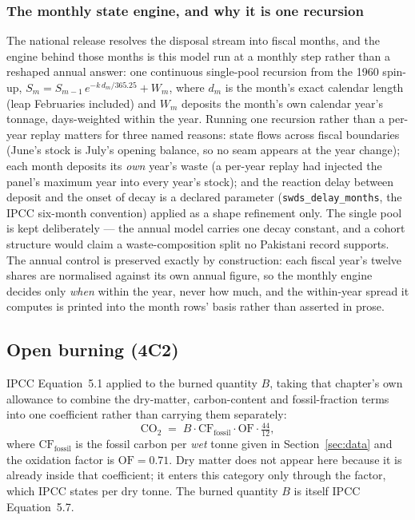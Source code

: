 \subsubsection{The monthly state engine, and why it is one recursion}

The national release resolves the disposal stream into fiscal months, and the
engine behind those months is this model run at a monthly step rather than a
reshaped annual answer: one continuous single-pool recursion from the 1960
spin-up, $S_m = S_{m-1}\,e^{-k\,d_m/365.25} + W_m$, where $d_m$ is the month's
exact calendar length (leap Februaries included) and $W_m$ deposits the month's
own calendar year's tonnage, days-weighted within the year. Running one recursion
rather than a per-year replay matters for three named reasons: state flows across
fiscal boundaries (June's stock is July's opening balance, so no seam appears at
the year change); each month deposits its \emph{own} year's waste (a per-year
replay had injected the panel's maximum year into every year's stock); and the
reaction delay between deposit and the onset of decay is a declared parameter
(\texttt{swds\_delay\_months}, the IPCC six-month convention) applied as a shape
refinement only. The single pool is kept deliberately --- the annual model carries
one decay constant, and a cohort structure would claim a waste-composition split
no Pakistani record supports. The annual control is preserved exactly by
construction: each fiscal year's twelve shares are normalised against its own
annual figure, so the monthly engine decides only \emph{when} within the year,
never how much, and the within-year spread it computes is printed into the
month rows' basis rather than asserted in prose.

\subsection{Open burning (4C2)}

IPCC Equation~5.1 applied to the burned quantity $B$, taking that chapter's own
allowance to combine the dry-matter, carbon-content and fossil-fraction terms into one
coefficient rather than carrying them separately:
\begin{equation}
\mathrm{CO_2} \;=\; B \cdot \mathrm{CF_{fossil}} \cdot \mathrm{OF}
  \cdot \tfrac{44}{12},
\end{equation}
where $\mathrm{CF_{fossil}}$ is the fossil carbon per \emph{wet} tonne given in
Section~\ref{sec:data} and the oxidation factor is $\mathrm{OF} = \num{0.71}$. Dry matter
does not appear here because it is already inside that coefficient; it enters this category
only through the \NtwoO{} factor, which IPCC states per dry tonne. The burned quantity $B$
is itself IPCC Equation~5.7.

